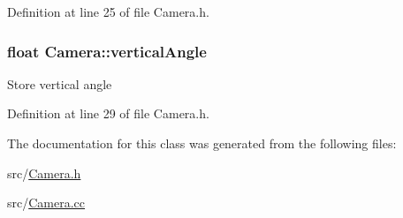 Definition at line 25 of file Camera.\+h.

\hypertarget{class_camera_a6582a5068d81b8de7a7fc67e5143e628}{}
\subsubsection[{vertical\+Angle}]{\setlength{\rightskip}{0pt plus 5cm}float Camera\+::vertical\+Angle\hspace{0.3cm}{\ttfamily [private]}}\label{class_camera_a6582a5068d81b8de7a7fc67e5143e628}
Store vertical angle 

Definition at line 29 of file Camera.\+h.



The documentation for this class was generated from the following files\+:\begin{DoxyCompactItemize}
\item 
src/\hyperlink{_camera_8h}{Camera.\+h}\item 
src/\hyperlink{_camera_8cc}{Camera.\+cc}\end{DoxyCompactItemize}
